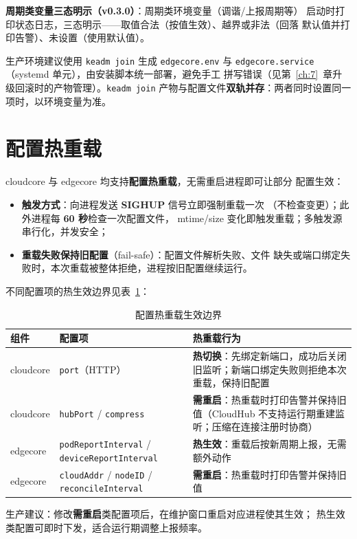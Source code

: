 \textbf{周期类变量三态明示（v0.3.0）}：周期类环境变量（调谐/上报周期等）
启动时打印状态日志，三态明示——取值合法（按值生效）、越界或非法（回落
默认值并打印告警）、未设置（使用默认值）。

生产环境建议使用 \texttt{keadm join} 生成 \texttt{edgecore.env} 与
\texttt{edgecore.service}（systemd 单元），由安装脚本统一部署，避免手工
拼写错误（见第~\ref{ch:7}~章升级回滚时的产物管理）。\texttt{keadm join}
产物与配置文件\textbf{双轨并存}：两者同时设置同一项时，以环境变量为准。

\section{配置热重载}

cloudcore 与 edgecore 均支持\textbf{配置热重载}，无需重启进程即可让部分
配置生效：

\begin{itemize}
  \item \textbf{触发方式}：向进程发送 \textbf{SIGHUP} 信号立即强制重载一次
        （不检查变更）；此外进程每 \textbf{60 秒}检查一次配置文件，
        mtime/size 变化即触发重载；多触发源串行化，并发安全；
  \item \textbf{重载失败保持旧配置}（fail-safe）：配置文件解析失败、文件
        缺失或端口绑定失败时，本次重载被整体拒绝，进程按旧配置继续运行。
\end{itemize}

不同配置项的热生效边界见表~\ref{tab:5-reload}：

\begin{table}[htbp]
\centering
\caption{配置热重载生效边界}
\label{tab:5-reload}
\begin{tabularx}{\textwidth}{l l X}
\toprule
\textbf{组件} & \textbf{配置项} & \textbf{热重载行为} \\
\midrule
cloudcore & \texttt{port}（HTTP） & \textbf{热切换}：先绑定新端口，成功后关闭旧监听；新端口绑定失败则拒绝本次重载，保持旧配置 \\
cloudcore & \texttt{hubPort} / \texttt{compress} & \textbf{需重启}：热重载时打印告警并保持旧值（CloudHub 不支持运行期重建监听；压缩在连接注册时协商） \\
edgecore & \texttt{podReportInterval} / \texttt{deviceReportInterval} & \textbf{热生效}：重载后按新周期上报，无需额外动作 \\
edgecore & \texttt{cloudAddr} / \texttt{nodeID} / \texttt{reconcileInterval} & \textbf{需重启}：热重载时打印告警并保持旧值 \\
\bottomrule
\end{tabularx}
\end{table}

生产建议：修改\textbf{需重启}类配置项后，在维护窗口重启对应进程使其生效；
热生效类配置可即时下发，适合运行期调整上报频率。

